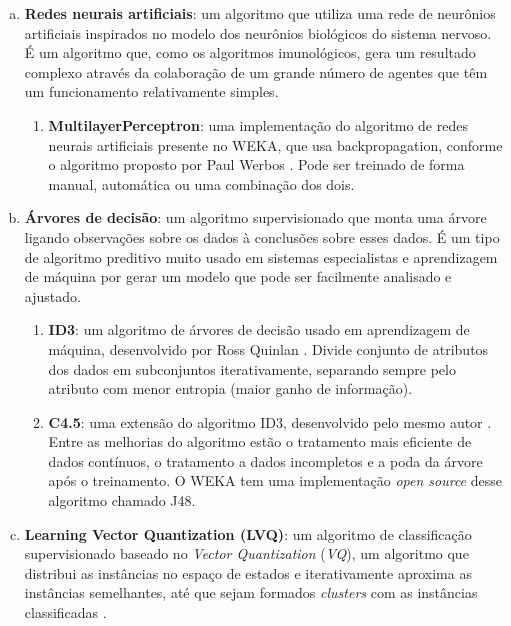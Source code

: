 \begin{enumerate}[a)]
    \item \textbf{Redes neurais artificiais}: um algoritmo que utiliza uma rede de neurônios artificiais inspirados no modelo dos neurônios biológicos do sistema nervoso. É um algoritmo que, como os algoritmos imunológicos, gera um resultado complexo através da colaboração de um grande número de agentes que têm um funcionamento relativamente simples.
        \begin{enumerate}[1.]
            \item \textbf{MultilayerPerceptron}: uma implementação do algoritmo de redes neurais artificiais presente no WEKA, que usa backpropagation, conforme o algoritmo proposto por Paul Werbos \cite{Werbos1974}. Pode ser treinado de forma manual, automática ou uma combinação dos dois.
        \end{enumerate}
    \item \textbf{Árvores de decisão}: um algoritmo supervisionado que monta uma árvore ligando observações sobre os dados à conclusões sobre esses dados. É um tipo de algoritmo preditivo muito usado em sistemas especialistas e aprendizagem de máquina por gerar um modelo que pode ser facilmente analisado e ajustado.
        \begin{enumerate}[1.]
            \item \textbf{ID3}: um algoritmo de árvores de decisão usado em aprendizagem de máquina, desenvolvido por Ross Quinlan \cite{Quinlan1986}. Divide conjunto de atributos dos dados em subconjuntos iterativamente, separando sempre pelo atributo com menor entropia (maior ganho de informação).
            \item \textbf{C4.5}: uma extensão do algoritmo ID3, desenvolvido pelo mesmo autor \cite{Quinlan1993}. Entre as melhorias do algoritmo estão o tratamento mais eficiente de dados contínuos, o tratamento a dados incompletos e a poda da árvore após o treinamento. O WEKA tem uma implementação \emph{open source} desse algoritmo chamado J48.
        \end{enumerate}
    \item \textbf{Learning Vector Quantization (LVQ)}: um algoritmo de classificação supervisionado baseado no \emph{Vector Quantization} (\emph{VQ}), um algoritmo que distribui as instâncias no espaço de estados e iterativamente aproxima as instâncias semelhantes, até que sejam formados \emph{clusters} com as instâncias classificadas \cite{Kohonen1997}.
        \begin{enumerate}[1.]

\end{enumerate}
\end{enumerate}
